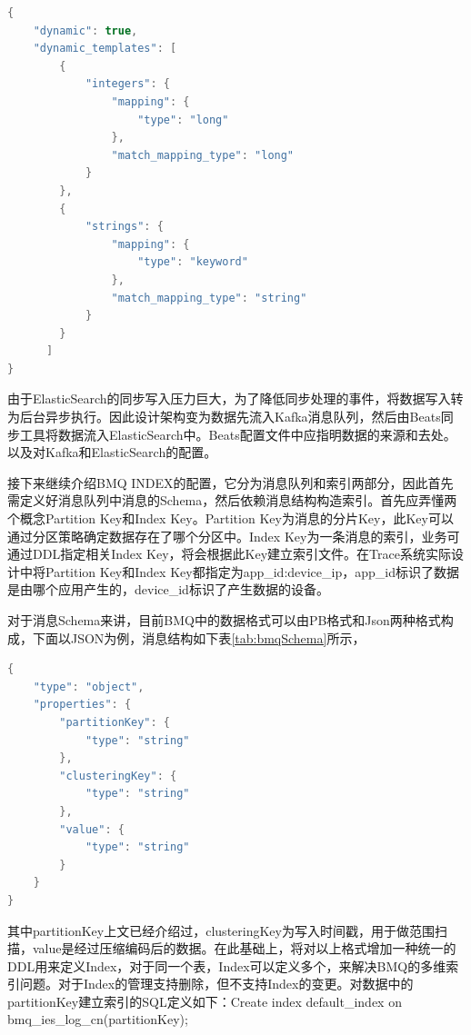 \begin{longtable}[htbp]
\begin{lrbox}{\esconfigindexbox}  
\begin{lstlisting}[language=Java]  
{
    "dynamic": true,
    "dynamic_templates": [
        {
            "integers": {
                "mapping": {
                    "type": "long"
                },
                "match_mapping_type": "long"
            }
        },
        {
            "strings": {
                "mapping": {
                    "type": "keyword"
                },
                "match_mapping_type": "string"
            }
        }
      ]
}
\end{lstlisting}  
\end{lrbox} 

\begin{table}[h]   
\caption{ElasticSearch动态索引配置信息}  
\label{tab:esindexconfig}  
\usebox{\esconfigindexbox}  
\end{table}  

由于ElasticSearch的同步写入压力巨大，为了降低同步处理的事件，将数据写入转为后台异步执行。因此设计架构变为数据先流入Kafka消息队列，然后由Beats同步工具将数据流入ElasticSearch中。Beats配置文件中应指明数据的来源和去处。以及对Kafka和ElasticSearch的配置。


接下来继续介绍BMQ INDEX的配置，它分为消息队列和索引两部分，因此首先需定义好消息队列中消息的Schema，然后依赖消息结构构造索引。首先应弄懂两个概念Partition Key和Index Key。Partition Key为消息的分片Key，此Key可以通过分区策略确定数据存在了哪个分区中。Index Key为一条消息的索引，业务可通过DDL指定相关Index Key，将会根据此Key建立索引文件。在Trace系统实际设计中将Partition Key和Index Key都指定为app\_id:device\_ip，app\_id标识了数据是由哪个应用产生的，device\_id标识了产生数据的设备。

对于消息Schema来讲，目前BMQ中的数据格式可以由PB格式和Json两种格式构成，下面以JSON为例，消息结构如下表\ref{tab:bmqSchema}所示，
\begin{lrbox}{\bmqSchema}  
\begin{lstlisting}[language=Java]  
{
    "type": "object",
    "properties": {
        "partitionKey": {
            "type": "string"
        },
        "clusteringKey": {
            "type": "string"
        },
        "value": {
            "type": "string"
        }
    }
}
\end{lstlisting}  
\end{lrbox} 
\begin{table}[h]   
\caption{BMQ数据Schema信息}  
\label{tab:bmqSchema}  
\usebox{\bmqSchema}  
\end{table}  
其中partitionKey上文已经介绍过，clusteringKey为写入时间戳，用于做范围扫描，value是经过压缩编码后的数据。在此基础上，将对以上格式增加一种统一的DDL用来定义Index，对于同一个表，Index可以定义多个，来解决BMQ的多维索引问题。对于Index的管理支持删除，但不支持Index的变更。对数据中的partitionKey建立索引的SQL定义如下：Create index default\_index on bmq\_ies\_log\_cn(partitionKey);

\end{longtable}
